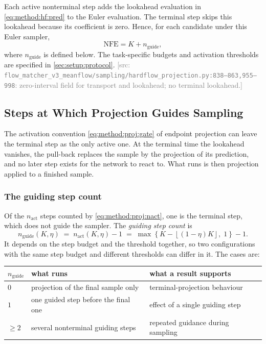 \documentclass[headsepline,footsepline,footinclude=false,oneside,fontsize=11pt,paper=a4,listof=totoc,bibliography=totoc]{scrbook}
\theoremstyle{definition}
\theoremstyle{plain}
\theoremstyle{remark}
\newcommand{\sidx}[1]{_{\textrm{#1}}}
\newcommand{\nfe}{K}                           %
\newif\ifsubmission
\newcommand{\srcnote}[1]{\ifsubmission\else\textcolor{gray}{\footnotesize\textsf{[src: #1]}}\fi}
\begin{document}
Each active nonterminal step adds the lookahead evaluation in \eqref{eq:method:hf:pred} to the
Euler evaluation. The terminal step skips this lookahead because its coefficient is zero. Hence,
for each candidate under this Euler sampler,
\begin{equation}\label{eq:method:hf:nfe}
  \mathrm{NFE}=\nfe+n\sidx{guide},
\end{equation}
where $n\sidx{guide}$ is defined below. The task-specific budgets and activation thresholds are
specified in \autoref{sec:setup:protocol}.
\srcnote{\texttt{flow\_matcher\_v3\_meanflow/sampling/hardflow\_projection.py:838--863,955--998}:
zero-interval field for transport and lookahead; no terminal lookahead.}

\subsection{Steps at Which Projection Guides Sampling}\label{sec:method:degenerate}

The activation convention \eqref{eq:method:proj:gate} of endpoint projection can leave the terminal step
as the only active one. At the terminal time the lookahead vanishes, the pull-back replaces the sample
by the projection of its prediction, and no later step exists for the network to react to. What runs is
then projection applied to a finished sample.

\subsubsection*{The guiding step count}

Of the $n\sidx{act}$ steps counted by \eqref{eq:method:proj:nact}, one is the terminal step, which does
not guide the sampler. The \emph{guiding step count} is
\begin{equation}\label{eq:method:degen:ngen}
  n\sidx{guide}(\nfe,\eta)
  \;=\; n\sidx{act}(\nfe,\eta) - 1
  \;=\; \max\!\left\{\nfe - \left\lfloor(1-\eta)\nfe\right\rfloor,\;1\right\} - 1 .
\end{equation}
It depends on the step budget and the threshold together, so two configurations with the same step
budget and different thresholds can differ in it. The cases are:

\begin{center}
\begin{tabularx}{\linewidth}{lLL}
  \toprule
  $n\sidx{guide}$ & what runs & what a result supports \\
  \midrule
  $0$     & projection of the final sample only        & terminal-projection behaviour \\
  $1$     & one guided step before the final one       & effect of a single guiding step \\
  $\ge 2$ & several nonterminal guiding steps          & repeated guidance during sampling \\
  \bottomrule
\end{tabularx}
\end{center}
\end{document}
